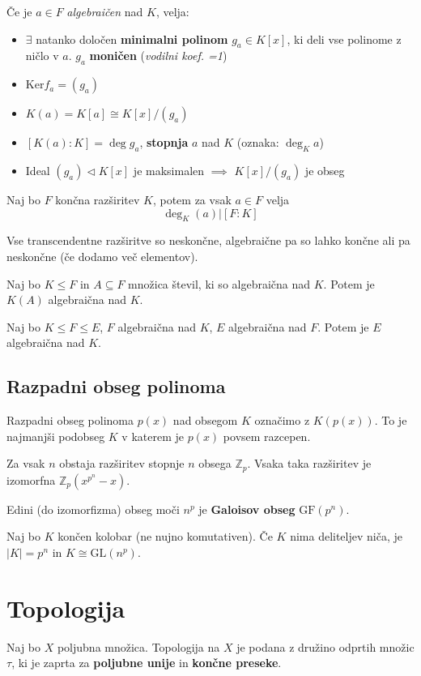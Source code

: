 Če je $a \in F$ \emph{algebraičen} nad $K$, velja:
\begin{itemize}
	\item $\exists$ natanko določen \textbf{minimalni polinom} $g_a \in K[x]$, ki deli vse polinome z ničlo v $a$.  $g_a$ \textbf{moničen} (\emph{vodilni koef. =1})
	\item $\text{Ker}f_a = (g_a)$
	\item $K(a) = K[a] \cong K[x] / (g_a)$
	\item $[K(a):K] = \deg g_a$, \textbf{stopnja} $a$ nad $K$ (oznaka: $\deg_K a$)
	\item Ideal $(g_a) \lhd K[x]$ je maksimalen $\implies$ $K[x] / (g_a)$ je obseg
\end{itemize}

Naj bo $F$ končna razširitev $K$, potem za vsak $a \in F$ velja 
\[\deg_K (a) \big| [F:K] \]

Vse transcendentne razširitve so neskončne, algebraične pa so lahko končne ali pa neskončne (če dodamo več elementov).

Naj bo $K \leq F$ in $A \subseteq F$ množica števil, ki so algebraična nad $K$. Potem je $K(A)$ algebraična nad $K$.

Naj bo $K \leq F \leq E$, $F$ algebraična nad $K$, $E$ algebraična nad $F$. Potem je $E$ algebraična nad $K$.

\subsection*{Razpadni obseg polinoma}
Razpadni obseg polinoma $p(x)$ nad obsegom $K$ označimo z $K(p(x))$. To je najmanjši podobseg $K$ v katerem je $p(x)$ povsem razcepen.

Za vsak $n$ obstaja razširitev stopnje $n$ obsega $\mathbb{Z}_p$. Vsaka taka razširitev je izomorfna $\mathbb{Z}_p (x^{p^n} - x)$.

Edini (do izomorfizma) obseg moči $n^p$ je \textbf{Galoisov obseg} $\text{GF}(p^n)$.

Naj bo $K$ končen kolobar (ne nujno komutativen). Če $K$ nima deliteljev niča, je $|K| = p^n$ in $K \cong \text{GL}(n^p)$.

\section*{Topologija}

Naj bo $X$ poljubna množica. Topologija na $X$ je podana z družino odprtih množic $\tau$, ki je zaprta za \textbf{poljubne unije} in \textbf{končne preseke}.

